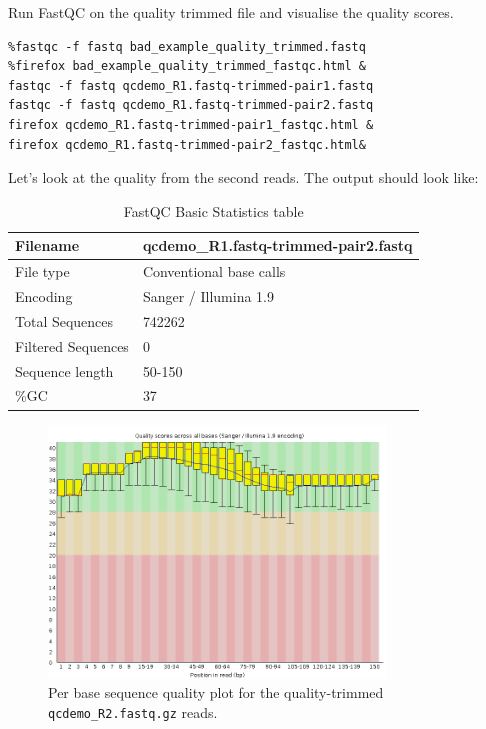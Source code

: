 \begin{steps}
Run FastQC on the quality trimmed file and visualise the quality scores.

\begin{lstlisting}
%fastqc -f fastq bad_example_quality_trimmed.fastq
%firefox bad_example_quality_trimmed_fastqc.html &
fastqc -f fastq qcdemo_R1.fastq-trimmed-pair1.fastq
fastqc -f fastq qcdemo_R1.fastq-trimmed-pair2.fastq
firefox qcdemo_R1.fastq-trimmed-pair1_fastqc.html &
firefox qcdemo_R1.fastq-trimmed-pair2_fastqc.html&
\end{lstlisting}

Let's look at the quality from the second reads. The output should look like:

\begin{table}[H]
  \centering
  \caption{FastQC Basic Statistics table}
    \begin{tabular}{ll}
    \toprule
    Filename & qcdemo\_R1.fastq-trimmed-pair2.fastq\\
    \midrule
    File type & Conventional base calls\\
    Encoding & Sanger / Illumina 1.9\\
    Total Sequences & 742262\\
    Filtered Sequences & 0\\
    Sequence length & 50-150\\
    \%GC & 37\\
    \bottomrule
    \end{tabular}
  \label{tab:badexamplequalitytrimmed}
\end{table}

\begin{figure}[H]
\centering
\includegraphics[width=0.8\textwidth]{handout/bad.qcdemo_R2_quality_trimmed.png}
\caption{Per base sequence quality plot for the quality-trimmed \texttt{qcdemo\_R2.fastq.gz} reads.}
\label{fig:bad_example_quality_trimmed_plot}
\end{figure}

\end{steps}

